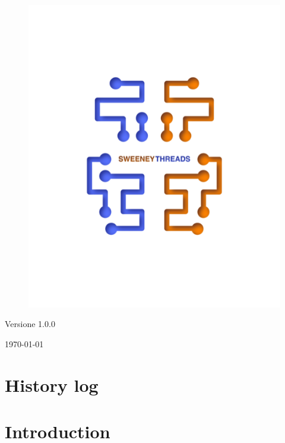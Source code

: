 \documentclass[a4paper]{article}
\begin{document}
\begin{titlepage}
		\begin{figure}[H]
			\centering
			\includegraphics[scale=0.8]{sweeney.png}
		\end{figure}
		\begin{center}
			Versione 1.0.0
		\end{center}
		{\large \today}\\[3cm] 
		\vfill  
	\end{titlepage}
	
	
	\tableofcontents
	
	\newpage
	\section*{History log}

	\newpage 
    \section{Introduction}
\end{document}
